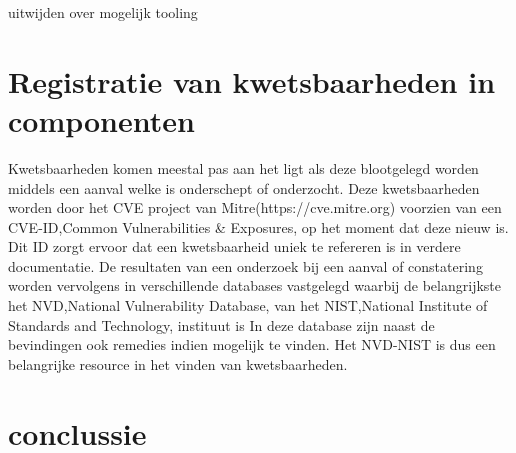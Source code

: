 uitwijden over mogelijk tooling
\section{Registratie van kwetsbaarheden in componenten}\label{sec:registratie-van-kwetsbaarheden-in-bibliotheken}
Kwetsbaarheden komen meestal pas aan het ligt als deze blootgelegd worden middels een aanval welke is onderschept of onderzocht. Deze kwetsbaarheden worden door het CVE project van Mitre(https://cve.mitre.org) voorzien van een CVE-ID,Common Vulnerabilities & Exposures, op het moment dat deze nieuw is. Dit ID zorgt ervoor dat een kwetsbaarheid uniek te refereren is in verdere documentatie. De resultaten van een onderzoek bij een aanval of constatering worden vervolgens in verschillende databases vastgelegd waarbij de belangrijkste het NVD,National Vulnerability Database,  van het NIST,National Institute of Standards and Technology, instituut is
In deze database zijn naast de bevindingen ook remedies indien mogelijk te vinden. Het NVD-NIST is dus een belangrijke resource in het vinden van kwetsbaarheden.


\section{conclussie}\label{sec:conclussie}
